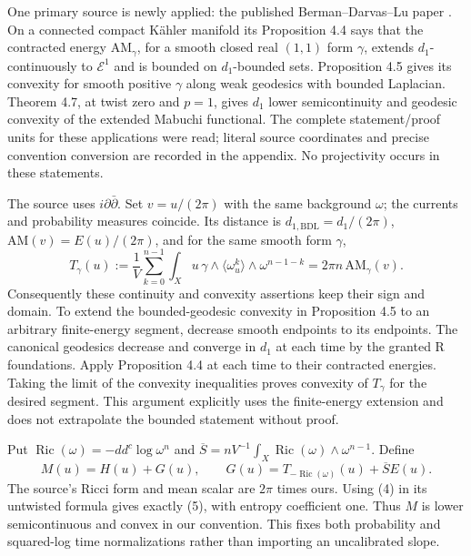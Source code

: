 \documentclass[11pt]{article}
\newcommand{\Ric}{\operatorname{Ric}}
\begin{document}
One primary source is newly applied: the published
Berman--Darvas--Lu paper \cite{BDL}. On a connected compact K\"ahler
manifold its Proposition 4.4 says that the contracted energy
$\mathrm{AM}_\gamma$, for a smooth closed real $(1,1)$ form $\gamma$,
extends $d_1$-continuously to $\mathcal E^1$ and is bounded on
$d_1$-bounded sets. Proposition 4.5 gives its convexity for smooth
positive $\gamma$ along weak geodesics with bounded Laplacian.
Theorem 4.7, at twist zero and $p=1$, gives $d_1$ lower
semicontinuity and geodesic convexity of the extended Mabuchi functional.
The complete statement/proof units for these applications were read;
literal source coordinates and precise convention conversion are
recorded in the appendix. No projectivity occurs in these statements.

The source uses $i\partial\bar\partial$. Set $v=u/(2\pi)$ with the
same background $\omega$; the currents and probability measures coincide.
Its distance is $d_{1,\mathrm{BDL}}=d_1/(2\pi)$,
$\mathrm{AM}(v)=E(u)/(2\pi)$, and for the same smooth form $\gamma$,
\[
 T_\gamma(u):=\frac1V\sum_{k=0}^{n-1}
  \int_Xu\,\gamma\wedge\langle\omega_u^k\rangle
                     \wedge\omega^{n-1-k}
 =2\pi n\,\mathrm{AM}_\gamma(v).                    \tag{4}
\]
Consequently these continuity and convexity assertions keep their
sign and domain. To extend the bounded-geodesic convexity in
Proposition 4.5 to an arbitrary finite-energy segment, decrease smooth
endpoints to its endpoints. The canonical geodesics decrease and
converge in $d_1$ at each time by the granted R foundations.
Apply Proposition 4.4 at each time to their contracted energies.
Taking the limit of the convexity inequalities proves convexity
of $T_\gamma$ for the desired segment. This argument explicitly
uses the finite-energy extension and does not extrapolate the
bounded statement without proof.

Put $\Ric(\omega)=-dd^c\log\omega^n$ and
$\overline S=nV^{-1}\int_X\Ric(\omega)\wedge\omega^{n-1}$. Define
\[
 M(u)=H(u)+G(u),\qquad
 G(u)=T_{-\Ric(\omega)}(u)+\overline S E(u).           \tag{5}
\]
The source's Ricci form and mean scalar are $2\pi$ times ours.
Using (4) in its untwisted formula gives exactly (5), with entropy
coefficient one. Thus $M$ is lower semicontinuous and convex in
our convention. This fixes both probability and squared-log time
normalizations rather than importing an uncalibrated slope.
\end{document}

